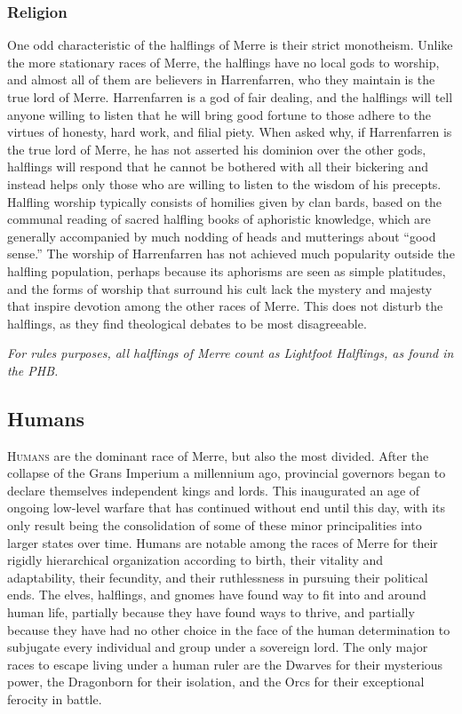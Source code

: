 \documentclass[paper=a4, fontsize=11pt]{scrartcl} %
\begin{document}
\begin{multicols}{2}
\subsubsection{Religion}

One odd characteristic of the halflings of Merre is their strict monotheism. Unlike the more stationary races of Merre, the halflings have no local gods to worship, and almost all of them are believers in Harrenfarren, who they maintain is the true lord of Merre. Harrenfarren is a god of fair dealing, and the halflings will tell anyone willing to listen that he will bring good fortune to those adhere to the virtues of honesty, hard work, and filial piety. When asked why, if Harrenfarren is the true lord of Merre, he has not asserted his dominion over the other gods, halflings will respond that he cannot be bothered with all their bickering and instead helps only those who are willing to listen to the wisdom of his precepts. Halfling worship typically consists of homilies given by clan bards, based on the communal reading of sacred halfling books of aphoristic knowledge, which are generally accompanied by much nodding of heads and mutterings about ``good sense.'' The worship of Harrenfarren has not achieved much popularity outside the halfling population, perhaps because its aphorisms are seen as simple platitudes, and the forms of worship that surround his cult lack the mystery and majesty that inspire devotion among the other races of Merre. This does not disturb the halflings, as they find theological debates to be most disagreeable.

\textit{For rules purposes, all halflings of Merre count as Lightfoot Halflings, as found in the PHB.}

\subsection{Humans}

\lettrine[lines=2]{\medievalsharp H}{umans} are the dominant race of Merre, but also the most divided. After the collapse of the Grans Imperium a millennium ago, provincial governors began to declare themselves independent kings and lords. This inaugurated an age of ongoing low-level warfare that has continued without end until this day, with its only result being the consolidation of some of these minor principalities into larger states over time. Humans are notable among the races of Merre for their rigidly hierarchical organization according to birth, their vitality and adaptability, their fecundity, and their ruthlessness in pursuing their political ends. The elves, halflings, and gnomes have found way to fit into and around human life, partially because they have found ways to thrive, and partially because they have had no other choice in the face of the human determination to subjugate every individual and group under a sovereign lord. The only major races to escape living under a human ruler are the Dwarves for their mysterious power, the Dragonborn for their isolation, and the Orcs for their exceptional ferocity in battle.


\end{multicols}
\end{document}
